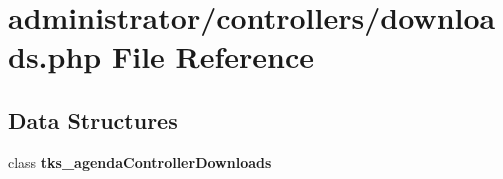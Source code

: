 \section{administrator/controllers/downloads.php File Reference}
\label{administrator_2controllers_2downloads_8php}
\subsection*{Data Structures}
\begin{DoxyCompactItemize}
\item 
class \textbf{ tks\+\_\+agenda\+Controller\+Downloads}
\end{DoxyCompactItemize}
